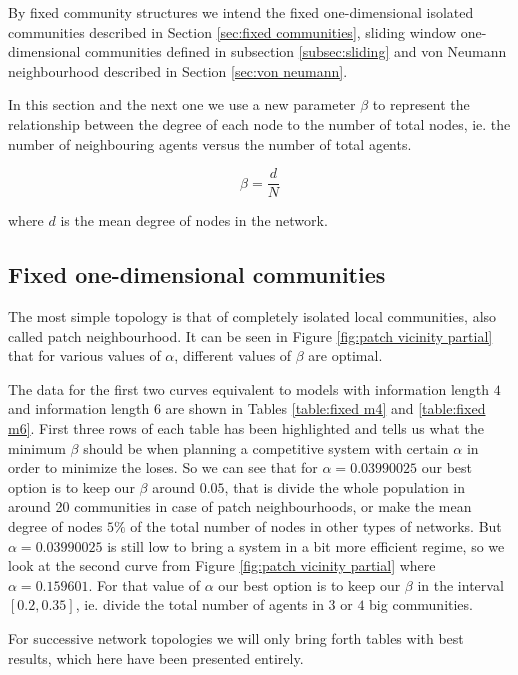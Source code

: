 By fixed community structures we intend the fixed one-dimensional isolated communities described in Section \ref{sec:fixed communities}, sliding window one-dimensional communities defined in subsection \ref{subsec:sliding} and von Neumann neighbourhood described in Section \ref{sec:von neumann}.

In this section and the next one we use a new parameter $\beta$ to represent the relationship between the degree of each node to the number of total nodes, ie. the number of neighbouring agents versus the number of total agents.

\begin{displaymath}
\beta = \frac{d}{N}
\end{displaymath}

where $d$ is the mean degree of nodes in the network.

\subsection{Fixed one-dimensional communities}

The most simple topology is that of completely isolated local communities, also called patch neighbourhood. It can be seen in Figure \ref{fig:patch vicinity partial} that for various values of $\alpha$, different values of $\beta$ are optimal.

The data for the first two curves equivalent to models with information length $4$ and information length $6$ are shown in Tables \ref{table:fixed m4} and \ref{table:fixed m6}.
First three rows of each table has been highlighted and tells us what the minimum $\beta$ should be when planning a competitive system with certain $\alpha$ in order to minimize the loses.
So we can see that for $\alpha=0.03990025$ our best option is to keep our $\beta$ around $0.05$, that is divide the whole population in around 20 communities in case of patch neighbourhoods, or make the mean degree of nodes $5\%$ of the total number of nodes in other types of networks.
But $\alpha=0.03990025$ is still low to bring a system in a bit more efficient regime, so we look at the second curve from Figure \ref{fig:patch vicinity partial} where $\alpha=0.159601$.
For that value of $\alpha$ our best option is to keep our $\beta$ in the interval $[0.2,0.35]$, ie. divide the total number of agents in $3$ or $4$ big communities.

For successive network topologies we will only bring forth tables with best results, which here have been presented entirely.


